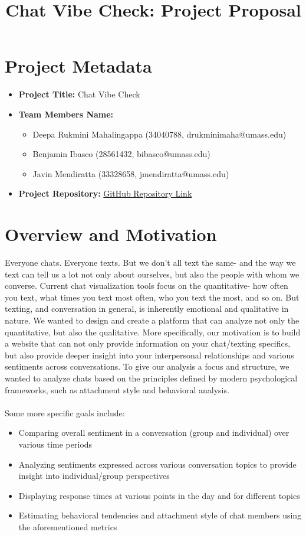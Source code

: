 \documentclass{article}\usepackage{graphicx}
\title{\textbf{Chat Vibe Check: Project Proposal}}
\begin{document}
\maketitle

\section{Project Metadata}
\begin{itemize}
    \item \textbf{Project Title:} Chat Vibe Check
    \item \textbf{Team Members Name:} 
    \begin{itemize}
        \item Deepa Rukmini Mahalingappa (34040788, drukminimaha@umass.edu)
        \item Benjamin Ibasco (28561432, bibasco@umass.edu)
        \item Javin Mendiratta (33328658, jmendiratta@umass.edu)
    \end{itemize}
   
    \item \textbf{Project Repository:} \href{https://github.com/bibascoumass/chat-vibe-check}{GitHub Repository Link}
\end{itemize}

\section*{Overview and Motivation}
Everyone chats. Everyone texts. But we don't all text the same- and the way we text can tell us a lot not only about ourselves, but also the people with whom we converse. Current chat visualization tools focus on the quantitative- how often you text, what times you text most often, who you text the most, and so on. But texting, and conversation in general, is inherently emotional and qualitative in nature. We wanted to design and create a platform that can analyze not only the quantitative, but also the qualitative. More specifically, our motivation is to build a website that can not only provide information on your chat/texting specifics, but also provide deeper insight into your interpersonal relationships and various sentiments across conversations. To give our analysis a focus and structure, we wanted to analyze chats based on the principles defined by modern psychological frameworks, such as attachment style and behavioral analysis.
\\\\
Some more specific goals include:
\begin{itemize}
    \item Comparing overall sentiment in a conversation (group and individual) over various time periods
    \item Analyzing sentiments expressed across various conversation topics to provide insight into individual/group perspectives 
    \item Displaying response times at various points in the day and for different topics
    \item Estimating behavioral tendencies and attachment style of chat members using the aforementioned metrics
\end{itemize}
\end{document}
